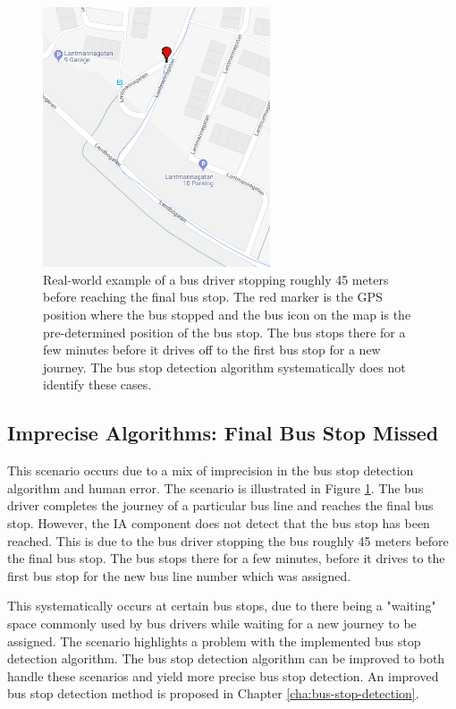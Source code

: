 \begin{figure}[!ht]
    \centering
    \includegraphics[width=0.6\textwidth]{figures/stopped_before_end}
    \caption[Real-world example of a bus driver stopping roughly 45 meters before reaching the final bus stop]
    {\small Real-world example of a bus driver stopping roughly 45 meters before reaching the final bus stop.
    The red marker is the GPS position where the bus stopped and the bus icon on the map is the pre-determined position of the bus stop.
    The bus stops there for a few minutes before it drives off to the first bus stop for a new journey.
    The bus stop detection algorithm systematically does not identify these cases.}
    \label{fig:stopped-before-end}
\end{figure}

\newpage
\subsection{Imprecise Algorithms: Final Bus Stop Missed}
This scenario occurs due to a mix of imprecision in the bus stop detection algorithm and human error.
The scenario is illustrated in Figure \ref{fig:stopped-before-end}.
The bus driver completes the journey of a particular bus line and reaches the final bus stop.
However, the IA component does not detect that the bus stop has been reached.
This is due to the bus driver stopping the bus roughly 45 meters before the final bus stop.
The bus stops there for a few minutes, before it drives to the first bus stop for the new bus line number which was assigned.

This systematically occurs at certain bus stops, due to there being a "waiting" space commonly used by bus drivers while waiting for a new journey to be assigned.
The scenario highlights a problem with the implemented bus stop detection algorithm.
The bus stop detection algorithm can be improved to both handle these scenarios and yield more precise bus stop detection.
An improved bus stop detection method is proposed in Chapter \ref{cha:bus-stop-detection}.

